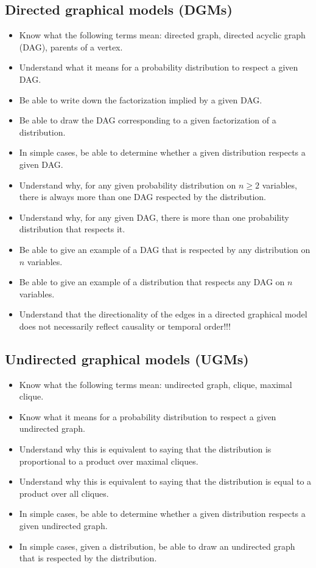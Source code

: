 \documentclass[12pt]{article}
\begin{document}
\subsection{Directed graphical models (DGMs)}
\begin{itemize}
\item Know what the following terms mean: directed graph, directed acyclic graph (DAG), parents of a vertex.
\item Understand what it means for a probability distribution to respect a given DAG.
\item Be able to write down the factorization implied by a given DAG.
\item Be able to draw the DAG corresponding to a given factorization of a distribution.
\item In simple cases, be able to determine whether a given distribution respects a given DAG.
\item Understand why, for any given probability distribution on $n\geq 2$ variables, there is always more than one DAG respected by the distribution.
\item Understand why, for any given DAG, there is more than one probability distribution that respects it.
\item Be able to give an example of a DAG that is respected by any distribution on $n$ variables.
\item Be able to give an example of a distribution that respects any DAG on $n$ variables.
\item Understand that the directionality of the edges in a directed graphical model does not necessarily reflect causality or temporal order!!!
\end{itemize}

\subsection{Undirected graphical models (UGMs)}
\begin{itemize}
\item Know what the following terms mean: undirected graph, clique, maximal clique.
\item Know what it means for a probability distribution to respect a given undirected graph.
\item Understand why this is equivalent to saying that the distribution is proportional to a product over maximal cliques.
\item Understand why this is equivalent to saying that the distribution is equal to a product over all cliques.
\item In simple cases, be able to determine whether a given distribution respects a given undirected graph.
\item In simple cases, given a distribution, be able to draw an undirected graph that is respected by the distribution.
\end{itemize}
\end{document}
